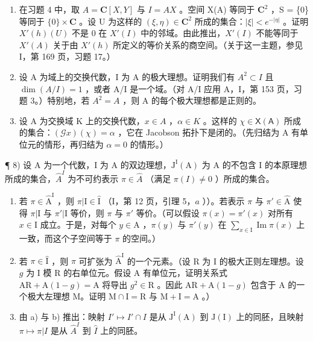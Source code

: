 \begin{enumerate}
\def\labelenumi{\arabic{enumi})}
\setcounter{enumi}{4}
\item
  在习题 4 中，取 \(A = \mathbf{C}[X,Y]\) 与 \(I = AX\) 。空间 X(A) 等同于 \(\mathbf{C}^2\) ，S = \{0\} 等同于 \(\{0\} \times \mathbf{C}\) 。设 U 为这样的 \((\xi, \eta) \in \mathbf{C}^2\) 所成的集合：\(|\xi| < e^{-|\eta|}\) 。证明 \(X'(h)(U)\) 不是 0 在 \(X'(I)\) 中的邻域。由此推出，\(X'(I)\) 不能等同于 \(X'(A)\) 关于由 \(X'(h)\) 所定义的等价关系的商空间。（关于这一主题，参见 I，第 169 页，习题 17。）
\item
  设 A 为域上的交换代数，I 为 A 的极大理想。证明我们有 \(A^{2} \subset I\) 且 \(\dim(A/I) = 1\) ，或者 A/I 是一个域。（对 A/I 应用 A，I，第 153 页，习题 3。）特别地，若 \(A^{2} = A\) ，则 A 的每个极大理想都是正则的。
\item
  设 A 为交换域 K 上的交换代数，\(x \in A\) ，\(\alpha \in K\) 。这样的 \(\chi \in \mathsf{X}(\mathsf{A})\) 所成的集合：\((\mathcal{G}x)(\chi) = \alpha\) ，它在 Jacobson 拓扑下是闭的。（先归结为 A 有单位元的情形，再归结为 \(\alpha = 0\) 的情形。）
\end{enumerate}

¶ 8) 设 A 为一个代数，I 为 A 的双边理想，\(\mathrm{J}^{\mathrm{I}}(\mathrm{A})\) 为 A 的不包含 I 的本原理想所成的集合，\(\widehat{A}^{I}\) 为不可约表示 \(\pi \in \widehat{A}\) （满足 \(\pi(I) \neq 0\) ）所成的集合。

\begin{enumerate}
\def\labelenumi{\alph{enumi})}
\item
  若 \(\pi \in \widehat{\mathrm{A}}^{\mathrm{I}}\) ，则 \(\pi | \mathrm{I} \in \widehat{\mathrm{I}}\) （I，第 12 页，引理 5，\(a\) ））。若表示 \(\pi\) 与 \(\pi' \in \widehat{\mathrm{A}}\) 使得 \(\pi | \mathrm{I}\) 与 \(\pi'|\mathrm{I}\) 等价，则 \(\pi\) 与 \(\pi'\) 等价。（可以假设 \(\pi(x) = \pi'(x)\) 对所有 \(x \in \mathrm{I}\) 成立。于是，对每个 \(y \in \mathrm{A}\) ，\(\pi(y)\) 与 \(\pi'(y)\) 在 \(\sum_{x \in \mathrm{I}} \operatorname{Im} \pi(x)\) 上一致，而这个子空间等于 \(\pi\) 的空间。）
\item
  若 \(\pi \in \widehat{\mathrm{I}}\) ，则 \(\pi\) 可扩张为 \(\widehat{\mathrm{A}}^{\mathrm{I}}\) 的一个元素。（设 R 为 I 的极大正则左理想。设 \(g\) 为 I 模 R 的右单位元。假设 A 有单位元，证明关系式 \(\mathrm{AR} + \mathrm{A}(1 - g) = \mathrm{A}\) 将导出 \(g^2 \in \mathrm{R}\) 。因此 \(\mathrm{AR} + \mathrm{A}(1 - g)\) 包含于 A 的一个极大左理想 M。证明 \(\mathrm{M} \cap \mathrm{I} = \mathrm{R}\) 与 \(\mathrm{M} + \mathrm{I} = \mathrm{A}\) 。）
\item
  由 a) 与 b) 推出：映射 \(I'\mapsto I'\cap I\) 是从 \(\mathrm{J}^{\mathrm{I}}(\mathrm{A})\) 到 \(\mathrm{J}(\mathrm{I})\) 上的同胚，且映射 \(\pi\mapsto\pi|I\) 是从 \(\widehat{A}^{I}\) 到 \(\widehat{I}\) 上的同胚。
\end{enumerate}
\relax{}
